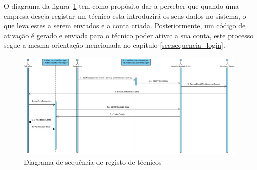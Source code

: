 O diagrama da figura~\ref{fig:45} tem como propósito dar a perceber que quando uma empresa deseja registar um técnico esta introduzirá os seus dados no sistema, o que leva estes a serem enviados e a conta criada. Posteriormente, um código de ativação é gerado e enviado para o técnico poder ativar a sua conta, este processo segue a mesma orientação mencionada no capítulo \ref{sec:sequencia_login}.

\begin{figure}[htb]
  \centering
  \includegraphics[width=\textwidth]{images/diagramas/sequencia/registo_tecnico.png}
  \caption{Diagrama de sequência de registo de técnicos}
  \label{fig:45}
\end{figure}